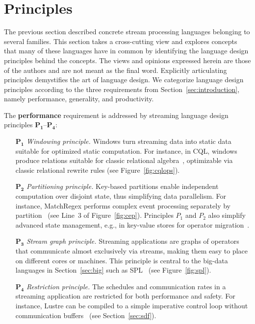 \section{Principles}\label{sec:principles}

The previous section described concrete stream processing languages
belonging to several families. This section takes a cross-cutting view
and explores concepts that many of these languages have in common by
identifying the language design principles behind the concepts.
The views and opinions expressed herein are those of the authors and
are not meant as the final word.  Explicitly articulating principles
demystifies the art of language design. We categorize language design
principles according to the three requirements from
Section~\ref{sec:introduction}, namely performance, generality, and
productivity.

The \textbf{performance} requirement is addressed by streaming
language design principles $\mathbf{P_1}$--$\mathbf{P_4}$:
\begin{itemize}
  \item[$\mathbf{P_1}$] \emph{Windowing principle.} Windows turn streaming
    data into static data suitable for optimized static computation.
    For instance, in CQL, windows produce relations suitable for
    classic relational algebra~\cite{arasu_babu_widom_2006},
    optimizable via classic relational rewrite rules (see
    Figure~\ref{fig:cqlops}).
  \item[$\mathbf{P_2}$] \emph{Partitioning principle.} Key-based partitions
    enable independent computation over disjoint state, thus
    simplifying data parallelism. %
    For instance, MatchRegex performs complex event processing separately by
    partition~\cite{hirzel_2012} (see Line~3 of Figure~\ref{fig:cep}).
    Principles $P_1$ and $P_2$ also simplify advanced state management, e.g.,
    in key-value stores for operator migration~\cite{gedik_et_al_2014}.
  \item[$\mathbf{P_3}$] \emph{Stream graph principle.} Streaming
    applications are graphs of operators that communicate almost
    exclusively via streams, making them easy to place on different
    cores or machines. This principle is central to the big-data
    languages in Section~\ref{sec:big} such as
    SPL~\cite{hirzel_schneider_gedik_2017} (see Figure~\ref{fig:spl}).
  \item[$\mathbf{P_4}$] \emph{Restriction principle.} The schedules and
    communication rates in a streaming application are restricted for
    both performance and safety. For instance, Lustre can be compiled
    to a simple imperative control loop without communication
    buffers~\cite{lustre_1987} (see Section~\ref{sec:sdf}).
\end{itemize}

